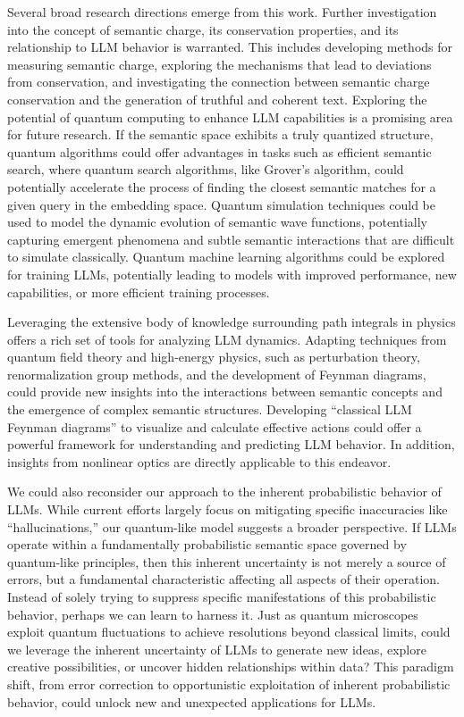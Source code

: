 \documentclass[prd,amsmath,amssymb,12pt]{revtex4}
\begin{document}
Several broad research directions emerge from this work. Further investigation into the concept
of semantic charge, its conservation properties, and its relationship to LLM behavior is
warranted. This includes developing methods for measuring semantic charge, exploring the
mechanisms that lead to deviations from conservation, and investigating the connection between
semantic charge conservation and the generation of truthful and coherent text. Exploring the
potential of quantum computing to enhance LLM capabilities is a promising area for future
research. If the semantic space exhibits a truly quantized structure, quantum algorithms could
offer advantages in tasks such as efficient semantic search, where quantum search algorithms,
like Grover's algorithm, could potentially accelerate the process of finding the closest
semantic matches for a given query in the embedding space. Quantum simulation techniques
could be used to model the dynamic evolution of semantic wave functions, potentially
capturing emergent phenomena and subtle semantic interactions that are difficult to simulate
classically. Quantum machine learning algorithms could be explored for training LLMs,
potentially leading to models with improved performance, new capabilities, or more efficient
training processes.

Leveraging the extensive body of knowledge surrounding path integrals
in physics offers a rich set of tools for analyzing LLM dynamics.
Adapting techniques from quantum field theory and high-energy physics, such as perturbation theory,
renormalization group methods, and the development of Feynman diagrams, could provide
new insights into the interactions between semantic concepts and the emergence of complex
semantic structures. Developing ``classical LLM Feynman diagrams'' to visualize and calculate
effective actions could offer a powerful framework for understanding and predicting LLM behavior.
In addition, insights from nonlinear optics are directly applicable to this endeavor.

We could also reconsider our approach to the inherent probabilistic behavior of LLMs.
While current efforts largely focus on mitigating specific inaccuracies like ``hallucinations,''
our quantum-like model suggests a broader perspective. If LLMs operate within a fundamentally
probabilistic semantic space governed by quantum-like principles, then this inherent
uncertainty is not merely a source of errors, but a fundamental characteristic affecting all
aspects of their operation. Instead of solely trying to suppress specific manifestations of
this probabilistic behavior, perhaps we can learn to harness it. Just as quantum microscopes
exploit quantum fluctuations to achieve resolutions beyond classical limits, could we
leverage the inherent uncertainty of LLMs to generate new ideas, explore creative possibilities,
or uncover hidden relationships within data? This paradigm shift, from error correction to
opportunistic exploitation of inherent probabilistic behavior, could unlock new and unexpected
applications for LLMs.
\end{document}
